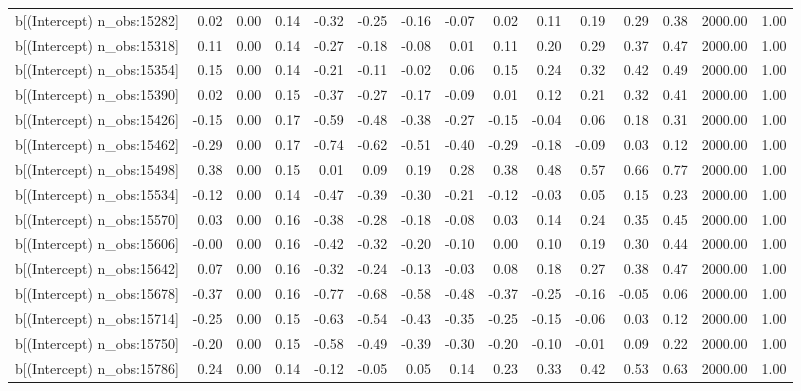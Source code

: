 \begin{table}[ht]
\begin{tabular}{rrrrrrrrrrrrrrr}
  b[(Intercept) n\_obs:15282] & 0.02 & 0.00 & 0.14 & -0.32 & -0.25 & -0.16 & -0.07 & 0.02 & 0.11 & 0.19 & 0.29 & 0.38 & 2000.00 & 1.00 \\ 
  b[(Intercept) n\_obs:15318] & 0.11 & 0.00 & 0.14 & -0.27 & -0.18 & -0.08 & 0.01 & 0.11 & 0.20 & 0.29 & 0.37 & 0.47 & 2000.00 & 1.00 \\ 
  b[(Intercept) n\_obs:15354] & 0.15 & 0.00 & 0.14 & -0.21 & -0.11 & -0.02 & 0.06 & 0.15 & 0.24 & 0.32 & 0.42 & 0.49 & 2000.00 & 1.00 \\ 
  b[(Intercept) n\_obs:15390] & 0.02 & 0.00 & 0.15 & -0.37 & -0.27 & -0.17 & -0.09 & 0.01 & 0.12 & 0.21 & 0.32 & 0.41 & 2000.00 & 1.00 \\ 
  b[(Intercept) n\_obs:15426] & -0.15 & 0.00 & 0.17 & -0.59 & -0.48 & -0.38 & -0.27 & -0.15 & -0.04 & 0.06 & 0.18 & 0.31 & 2000.00 & 1.00 \\ 
  b[(Intercept) n\_obs:15462] & -0.29 & 0.00 & 0.17 & -0.74 & -0.62 & -0.51 & -0.40 & -0.29 & -0.18 & -0.09 & 0.03 & 0.12 & 2000.00 & 1.00 \\ 
  b[(Intercept) n\_obs:15498] & 0.38 & 0.00 & 0.15 & 0.01 & 0.09 & 0.19 & 0.28 & 0.38 & 0.48 & 0.57 & 0.66 & 0.77 & 2000.00 & 1.00 \\ 
  b[(Intercept) n\_obs:15534] & -0.12 & 0.00 & 0.14 & -0.47 & -0.39 & -0.30 & -0.21 & -0.12 & -0.03 & 0.05 & 0.15 & 0.23 & 2000.00 & 1.00 \\ 
  b[(Intercept) n\_obs:15570] & 0.03 & 0.00 & 0.16 & -0.38 & -0.28 & -0.18 & -0.08 & 0.03 & 0.14 & 0.24 & 0.35 & 0.45 & 2000.00 & 1.00 \\ 
  b[(Intercept) n\_obs:15606] & -0.00 & 0.00 & 0.16 & -0.42 & -0.32 & -0.20 & -0.10 & 0.00 & 0.10 & 0.19 & 0.30 & 0.44 & 2000.00 & 1.00 \\ 
  b[(Intercept) n\_obs:15642] & 0.07 & 0.00 & 0.16 & -0.32 & -0.24 & -0.13 & -0.03 & 0.08 & 0.18 & 0.27 & 0.38 & 0.47 & 2000.00 & 1.00 \\ 
  b[(Intercept) n\_obs:15678] & -0.37 & 0.00 & 0.16 & -0.77 & -0.68 & -0.58 & -0.48 & -0.37 & -0.25 & -0.16 & -0.05 & 0.06 & 2000.00 & 1.00 \\ 
  b[(Intercept) n\_obs:15714] & -0.25 & 0.00 & 0.15 & -0.63 & -0.54 & -0.43 & -0.35 & -0.25 & -0.15 & -0.06 & 0.03 & 0.12 & 2000.00 & 1.00 \\ 
  b[(Intercept) n\_obs:15750] & -0.20 & 0.00 & 0.15 & -0.58 & -0.49 & -0.39 & -0.30 & -0.20 & -0.10 & -0.01 & 0.09 & 0.22 & 2000.00 & 1.00 \\ 
  b[(Intercept) n\_obs:15786] & 0.24 & 0.00 & 0.14 & -0.12 & -0.05 & 0.05 & 0.14 & 0.23 & 0.33 & 0.42 & 0.53 & 0.63 & 2000.00 & 1.00 \\ 

\end{tabular}
\end{table}

